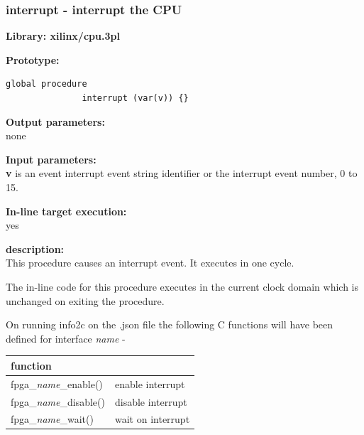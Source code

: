         \subsubsection{interrupt - interrupt the CPU}\label{sec:lpinterrupt}

            {\bf Library: xilinx/cpu.3pl}

            {\bf Prototype:} \\
            \vsp
            \begin{lstlisting}[gobble=12, language=threepl]
               global procedure
               interrupt (var(v)) {}
            \end{lstlisting}

            {\bf Output parameters:} \\
            none

            {\bf Input parameters:} \\            
            {\bf v} is an event interrupt event string identifier or the
            interrupt event number, 0 to 15.
        
            {\bf In-line target execution:} \\
            yes

            {\bf description:} \\
            This procedure
            causes an interrupt event. It executes in one cycle.
            
            The in-line code for this procedure executes in the current clock
            domain which is unchanged on exiting the procedure.
            
            On running info2c on the .json file the following C functions will have been
            defined for interface {\em name} -
            
            \begin{tabular}{| l | l |}
            \hline
            function                    &                   \\ \hline \hline
            fpga\_{\em name}\_enable()  & enable interrupt  \\ \hline
            fpga\_{\em name}\_disable() & disable interrupt \\ \hline 
            fpga\_{\em name}\_wait()    & wait on interrupt \\ \hline  
            \end{tabular}
            
